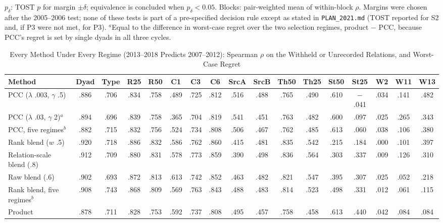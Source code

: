 \documentclass[journal]{IEEEtran}
\begin{document}
\begin{table}[!t]
\smallskip
\parbox{\columnwidth}{\scriptsize $p_\delta$: TOST $p$ for margin $\pm\delta$; equivalence is concluded when $p_\delta<0.05$. Blocks: pair-weighted mean of within-block $\rho$. Margins were chosen after the 2005--2006 test; none of these tests is part of a pre-specified decision rule except as stated in \texttt{PLAN\_2021.md} (TOST reported for S2 and, if P3 were not met, for P3). $^a$Equal to the difference in worst-case regret over the two selection regimes, product $-$ PCC, because PCC's regret is set by single dyads in all three cycles.}
\end{table}


\setcounter{table}{24}\begin{table}[!t]
\caption{Every Method Under Every Regime (2013--2018 Predicts 2007--2012): Spearman $\rho$ on the Withheld or Unrecorded Relations, and Worst-Case Regret}
\centering\scriptsize
\setlength{\tabcolsep}{2.4pt}
\begin{tabular}{@{}l c c c c c c c c c c c c c c c c@{}}
\toprule
Method & Dyad & Type & R25 & R50 & C1 & C3 & C6 & SrcA & SrcB & Th50 & Th25 & St50 & St25 & W2 & W11 & W13\\
\midrule
PCC ($\lambda$ .003, $\gamma$ .5) & .886 & .706 & .834 & .758 & .489 & .725 & .812 & .516 & .488 & .765 & .490 & .610 & $-$.041 & .034 & .141 & .482\\
PCC ($\lambda$ .03, $\gamma$ 2)$^a$ & .894 & .696 & .839 & .758 & .365 & .704 & .819 & .541 & .451 & .763 & .482 & .600 & .097 & .025 & .265 & .343\\
PCC, five regimes$^b$ & .882 & .715 & .832 & .756 & .524 & .734 & .808 & .506 & .467 & .762 & .485 & .613 & .060 & .038 & .106 & .380\\
Rank blend ($w$ .5) & .920 & .718 & .886 & .832 & .586 & .762 & .860 & .415 & .481 & .835 & .542 & .215 & .184 & .000 & .101 & .397\\
Relation-scale blend (.8) & .912 & .709 & .880 & .831 & .578 & .773 & .859 & .390 & .498 & .836 & .564 & .303 & .337 & .009 & .126 & .310\\
Raw blend (.6) & .902 & .693 & .872 & .813 & .613 & .742 & .852 & .463 & .482 & .821 & .547 & .395 & .307 & .025 & .052 & .218\\
Rank blend, five regimes$^b$ & .908 & .743 & .868 & .809 & .569 & .763 & .843 & .488 & .483 & .814 & .523 & .498 & .331 & .012 & .061 & .115\\
\midrule
Product & .878 & .711 & .828 & .753 & .592 & .737 & .808 & .495 & .457 & .758 & .458 & .613 & .440 & .042 & .084 & .084\\

\end{tabular}
\end{table}
\end{document}
